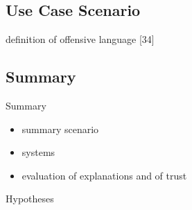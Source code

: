 \subsection{Use Case Scenario}
definition of offensive language [34] \newline








\subsection{Summary}
Summary\newline
\begin{itemize}
	\item summary scenario
	\item systems
	\item evaluation of explanations and of trust
\end{itemize}
Hypotheses













